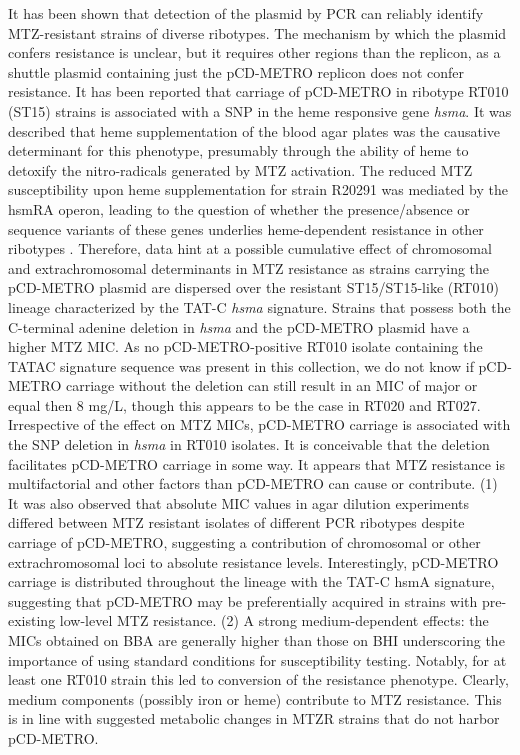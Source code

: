 \documentclass{article}
\begin{document}
It has been shown that detection of the plasmid by PCR can reliably identify MTZ-resistant strains of diverse ribotypes. The mechanism by which the plasmid confers resistance is unclear, but it requires other regions than the replicon, as a shuttle plasmid containing just the pCD-METRO replicon does not confer resistance. It has been reported that carriage of pCD-METRO in ribotype RT010 (ST15) strains is associated with a SNP in the heme responsive gene {\it hsma}. It was described that heme supplementation of the blood agar plates was the causative determinant for this phenotype, presumably through the ability of heme to detoxify the nitro-radicals generated by MTZ activation. The reduced MTZ susceptibility upon heme supplementation for strain R20291 was mediated by the hsmRA operon, leading to the question of whether the presence/absence or sequence variants of these genes underlies heme-dependent resistance in other ribotypes \cite{Boekhoud2}. Therefore, data hint at a possible cumulative effect of chromosomal and extrachromosomal determinants in MTZ resistance as strains carrying the pCD-METRO plasmid are dispersed over the resistant ST15/ST15-like (RT010) lineage characterized by the TAT-C {\it hsma} signature. Strains that possess both the C-terminal adenine deletion in {\it hsma} and the pCD-METRO plasmid have a higher MTZ MIC. As no pCD-METRO-positive RT010 isolate containing the TATAC signature sequence was present in this collection, we do not know if pCD-METRO carriage without the deletion can still result in an MIC of major or equal then 8 mg/L, though this appears to be the case in RT020 and RT027. Irrespective of the effect on MTZ MICs, pCD-METRO carriage is associated with the SNP deletion in {\it hsma} in RT010 isolates. It is conceivable that the deletion facilitates pCD-METRO carriage in some way. It appears that MTZ resistance is multifactorial and other factors than pCD-METRO can cause or contribute. (1) It was also observed that absolute MIC values in agar dilution experiments differed between MTZ resistant isolates of different PCR ribotypes despite carriage of pCD-METRO, suggesting a contribution of chromosomal or other extrachromosomal loci to absolute resistance levels. Interestingly, pCD-METRO carriage is distributed throughout the lineage with the TAT-C hsmA signature, suggesting that pCD-METRO may be preferentially acquired in strains with pre-existing low-level MTZ resistance. (2) A strong medium-dependent effects: the MICs obtained on BBA are generally higher than those on BHI underscoring the
importance of using standard conditions for susceptibility testing. Notably, for at least one RT010 strain this led to conversion of the resistance phenotype. Clearly, medium
components (possibly iron or heme) contribute to MTZ resistance. This is in line with suggested metabolic changes in MTZR strains that do not harbor pCD-METRO.
\end{document}
